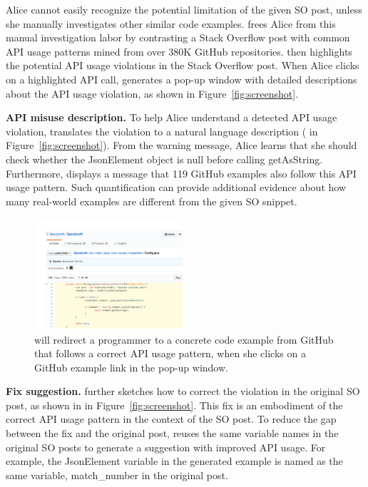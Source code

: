 Alice cannot easily recognize the potential limitation of the given SO post, unless she manually investigates other similar code examples. {\tool} frees Alice from this manual investigation labor by contrasting a Stack Overflow post with common API usage patterns mined from over 380K GitHub repositories. {\tool} then highlights the potential API usage violations in the Stack Overflow post. When Alice clicks on a highlighted API call, {\tool} generates a pop-up window with detailed descriptions about the API usage violation, as shown in Figure~\ref{fig:screenshot}.

{\bf API misuse description.} To help Alice understand a detected API usage violation, {\tool} translates the violation to a  natural language description ( in Figure~\ref{fig:screenshot}). From the warning message, Alice learns that she should check whether the {\ttt JsonElement} object is {\ttt null} before calling {\ttt getAsString}. Furthermore, {\tool} displays a message that 119 GitHub examples also follow this API usage pattern. Such quantification can provide additional evidence about how many real-world examples are different from the given SO snippet.

\begin{figure}
\centering
\includegraphics[width=0.49\textwidth]{github-example-v3.pdf}
  \caption{{\tool} will redirect a programmer to a concrete code example from GitHub that follows a correct API usage pattern, when she clicks on a GitHub example link in the pop-up window.\protect\footnotemark}
  \label{fig:github}
\end{figure}


{\bf Fix suggestion.} {\tool} further sketches how to correct the violation in the original SO post, as shown in  in Figure~\ref{fig:screenshot}. This fix is an embodiment of the correct API usage pattern in the context of the SO post. To reduce the gap between the fix and the original post, {\tool} reuses the same variable names in the original SO posts to generate a suggestion with improved API usage. For example, the {\ttt JsonElement} variable in the generated example is named as the same variable, {\ttt match\_number} in the original post.

